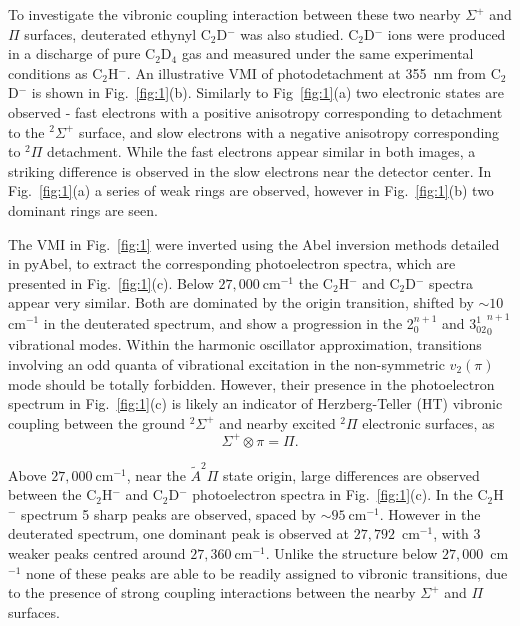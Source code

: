 \documentclass[journal=jpcafh,manuscript=article,layout=onecolumn, 12pt]{achemso}
\begin{document}
To investigate the vibronic coupling interaction between these two nearby $\Sigma^+$ and $\Pi$ surfaces, deuterated ethynyl C$_2$D$^-$ was also studied. C$_2$D$^-$ ions were produced in a discharge of pure C$_2$D$_4$ gas and measured under the same experimental conditions as C$_2$H$^-$. An illustrative VMI of photodetachment at 355~nm from C$_2$D$^-$ is shown in Fig.~\ref{fig:1}(b). Similarly to Fig~\ref{fig:1}(a) two electronic states are observed - fast electrons with a positive anisotropy corresponding to detachment to the $^2\Sigma^+$ surface, and slow electrons with a negative anisotropy corresponding to $^2\Pi$ detachment. While the fast electrons appear similar in both images, a striking difference is observed in the slow electrons near the detector center. In Fig.~\ref{fig:1}(a) a series of weak rings are observed, however in Fig.~\ref{fig:1}(b) two dominant rings are seen.

The VMI in Fig.~\ref{fig:1} were inverted using the Abel inversion methods detailed in pyAbel, to extract the corresponding photoelectron spectra, which are presented in Fig.~\ref{fig:1}(c). Below $27,000~$cm$^{-1}$ the C$_2$H$^-$ and C$_2$D$^-$ spectra appear very similar. Both are dominated by the origin transition, shifted by $\sim10~$cm$^{-1}$ in the deuterated spectrum, and show a progression in the 2$^{n+1}_0$ and 3$^1_02^{n+1}_0$ vibrational modes. Within the harmonic oscillator approximation, transitions involving an odd quanta of vibrational excitation in the non-symmetric $v_2 (\pi)$ mode should be totally forbidden. However, their presence in the photoelectron spectrum in Fig.~\ref{fig:1}(c) is likely an indicator of Herzberg-Teller (HT) vibronic coupling between the ground $^2\Sigma^+$ and nearby excited $^2\Pi$ electronic surfaces, as
\begin{equation}
\Sigma^+ \otimes \pi = \Pi. 
\end{equation}

Above $27,000~$cm$^{-1}$, near the $\tilde{A}^2\Pi$ state origin, large differences are observed between the C$_2$H$^-$ and C$_2$D$^-$ photoelectron spectra in Fig.~\ref{fig:1}(c). In the C$_2$H$^-$ spectrum 5 sharp peaks are observed, spaced by $\sim95~$cm$^{-1}$. However in the deuterated spectrum, one dominant peak is observed at $27,792$~cm$^{-1}$, with 3 weaker peaks centred around $27,360~$cm$^{-1}$. Unlike the structure below $27,000$~cm$^{-1}$ none of these peaks are able to be readily assigned to vibronic transitions, due to the presence of strong coupling interactions between the nearby $\Sigma^+$ and $\Pi$ surfaces.
\end{document}
